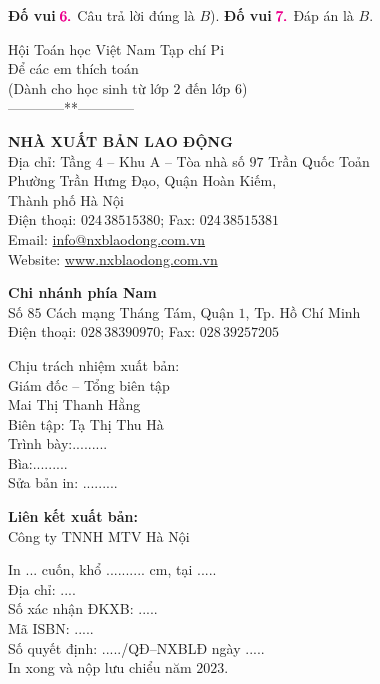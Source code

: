 \textbf{\color{toancuabi}Đố vui} $\color{toancuabi}\pmb{6.}$ Câu trả lời đúng là $B$).
\vskip 0.1cm
\textbf{\color{toancuabi}Đố vui} $\color{toancuabi}\pmb{7.}$ Đáp án là $B$.
\newpage
\begin{center}
	Hội Toán học Việt Nam Tạp chí Pi\\
	Để các em thích toán\\
	(Dành cho học sinh từ lớp $2$ đến lớp $6$)\\

	------------**------------ 
\end{center}
\begin{center}
	\textbf{NHÀ XUẤT BẢN LAO ĐỘNG}\\
	\vskip 0.1cm
	Địa chỉ: Tầng $4$ -- Khu A -- Tòa nhà số $97$ Trần Quốc Toản\\
	Phường Trần Hưng Đạo, Quận Hoàn Kiếm,\\ Thành phố Hà Nội\\
	Điện thoại: $024\, 38515380$; Fax: $024\,38515381$\\
	Email: \url{info@nxblaodong.com.vn}\\
	Website: \url{www.nxblaodong.com.vn}
\end{center}
\begin{center}
	\textbf{Chi nhánh phía Nam}\\
	\vskip 0.1cm
	Số $85$ Cách mạng Tháng Tám, Quận $1$, Tp. Hồ Chí Minh\\
	Điện thoại: $028\, 38390970$; Fax: $028\, 39257205$
\end{center}
\begin{center}
	Chịu trách nhiệm xuất bản:\\
	Giám đốc -- Tổng biên tập\\
	Mai Thị Thanh Hằng\\
	Biên tập: Tạ Thị Thu Hà\\
	\vskip 0.1cm
	\vspace*{5pt}
	Trình bày:.........\\
	Bìa:.........\\
	Sửa bản in: .........
\end{center}

\begin{center}
	\textbf{Liên kết xuất bản:}\\
	\vskip 0.1cm
	Công ty TNNH MTV Hà Nội
\end{center}

In ... cuốn, khổ .......... cm, tại .....\\
Địa chỉ: ....\\
Số xác nhận ĐKXB: .....\\
Mã ISBN: .....\\
Số quyết định: ...../QĐ--NXBLĐ ngày .....\\
In xong và nộp lưu chiểu năm $2023$.